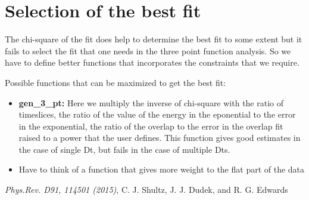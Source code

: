 \documentclass[11pt]{article}
\begin{document}
\section*{Selection of the best fit}
The chi-square of the fit does help to determine the best fit to some extent but it fails to select the fit that one needs in the three point function analysis. So we have to define better functions that incorporates the constraints that we require.  \par
Possible functions that can be maximized to get the best fit: 
\begin{itemize}
  \item \textbf{gen\_3\_pt:} Here we multiply the inverse of chi-square with the ratio of timeslices, the ratio of the value of the energy in the eponential to the error in the exponential, the ratio of the overlap to the error in the overlap fit raised to a power that the user defines. This function gives good estimates in the case of single Dt, but fails in the case of multiple Dts.  
  \item Have to think of a function that gives more weight to the flat part of the data
\end{itemize}

\newpage
\begin{thebibliography}{9}

     \textit{Phys.Rev. D91, 114501 (2015)},         
       C. J. Shultz, J. J. Dudek, and R. G. Edwards       


\end{thebibliography}
\end{document}
